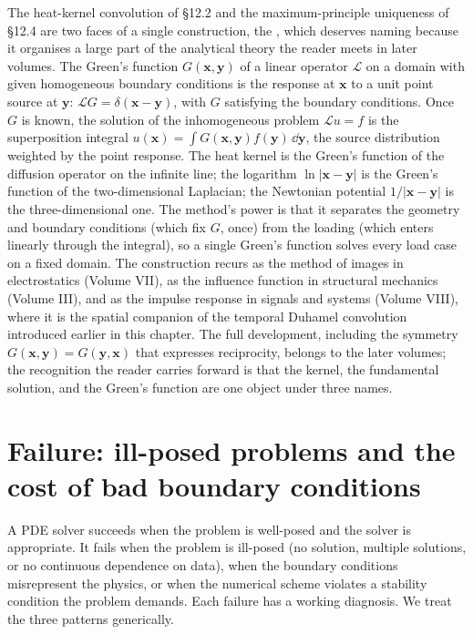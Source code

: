 \begin{mastery}
The heat-kernel convolution of §12.2 and the maximum-principle
uniqueness of §12.4 are two faces of a single construction, the
, which deserves naming because it
organises a large part of the analytical theory the reader meets in
later volumes. The Green's function $G(\mathbf{x}, \mathbf{y})$ of a
linear operator $\mathcal{L}$ on a domain with given homogeneous
boundary conditions is the response at $\mathbf{x}$ to a unit point
source at $\mathbf{y}$: $\mathcal{L} G = \delta(\mathbf{x} -
\mathbf{y})$, with $G$ satisfying the boundary conditions. Once $G$
is known, the solution of the inhomogeneous problem $\mathcal{L} u =
f$ is the superposition integral $u(\mathbf{x}) = \int G(\mathbf{x},
\mathbf{y}) f(\mathbf{y})\,\dd\mathbf{y}$, the source distribution
weighted by the point response. The heat kernel is the Green's
function of the diffusion operator on the infinite line; the
logarithm $\ln|\mathbf{x} - \mathbf{y}|$ is the Green's function of
the two-dimensional Laplacian; the Newtonian potential
$1/|\mathbf{x} - \mathbf{y}|$ is the three-dimensional one. The
method's power is that it separates the geometry and boundary
conditions (which fix $G$, once) from the loading (which enters
linearly through the integral), so a single Green's function solves
every load case on a fixed domain. The construction recurs as the
method of images in electrostatics (Volume VII), as the influence
function in structural mechanics (Volume III), and as the impulse
response in signals and systems (Volume VIII), where it is the
spatial companion of the temporal Duhamel convolution introduced
earlier in this chapter. The full development, including the
symmetry $G(\mathbf{x}, \mathbf{y}) = G(\mathbf{y}, \mathbf{x})$
that expresses reciprocity, belongs to the later volumes; the
recognition the reader carries forward is that the kernel, the
fundamental solution, and the Green's function are one object under
three names.
\end{mastery}

\section{Failure: ill-posed problems and the cost of bad boundary conditions}

A PDE solver succeeds when the problem is well-posed and the
solver is appropriate. It fails when the problem is ill-posed
(no solution, multiple solutions, or no continuous dependence on
data), when the boundary conditions misrepresent the physics, or
when the numerical scheme violates a stability condition the
problem demands. Each failure has a working diagnosis. We treat
the three patterns generically.

